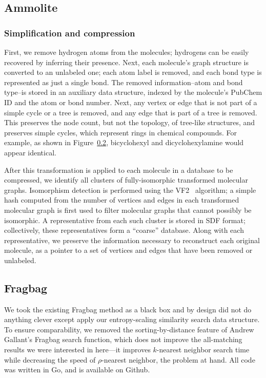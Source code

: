 \documentclass[review,preprint,12pt]{elsarticle}
\renewcommand{\cite}{\citep} %
\theoremstyle{definition}
\theoremstyle{remark}
\numberwithin{equation}{section}
\begin{document}
\subsection{Ammolite}

\subsubsection{Simplification and compression}

First, we remove hydrogen atoms from the molecules; hydrogens can be easily recovered by inferring their 
presence.
Next, each molecule's graph structure is converted to an unlabeled one; each atom label is removed, and each
bond type is represented as just a single bond.
The removed information--atom and bond type--is stored in an auxiliary data structure, indexed by the molecule's
PubChem ID and the atom or bond number.
Next, any vertex or edge that is not part of a simple cycle or a tree is removed, and any edge that is part
of a tree is removed.
This preserves the node count, but not the topology, of tree-like structures, and preserves simple cycles,
which represent rings in chemical compounds.
For example, as shown in Figure~\ref{}, bicyclohexyl and dicyclohexylamine would appear identical.

After this transformation is applied to each molecule in a database to be compressed, we identify all clusters
of fully-isomorphic transformed molecular graphs.
Isomorphism detection is performed using the VF2~\cite{cordella2001improved} 
algorithm; a simple hash computed from the
number of vertices and edges in each transformed molecular graph is first used 
to filter molecular graphs that cannot possibly be isomorphic.
A representative from each such cluster is stored in SDF format; collectively, these representatives form a 
``coarse'' database.
Along with each representative, we preserve the information necessary to reconstruct each original molecule,
as a pointer to a set of vertices and edges that have been removed or unlabeled.

\subsection{Fragbag}
We took the existing Fragbag method as a black box and by design did not do anything clever except apply our entropy-scaling similarity search data structure.
To ensure comparability, we removed the sorting-by-distance feature of Andrew Gallant's Fragbag search function, which does not improve the all-matching results we were interested in here---it improves $k$-nearest neighbor search time while decreasing the speed of $\rho$-nearest neighbor, the problem at hand.
All code was written in Go, and is available on Github.
\end{document}

